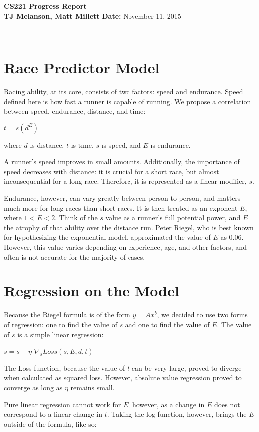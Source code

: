 \documentclass{article}
\newcommand{\hwheadings}[1]{
{\bf \hspace{-2.5mm} CS221 Progress Report} \hfill { }\\
{{\bf TJ Melanson, Matt Millett}} \hfill {{\bf Date:} #1}\\
 \\
\rule[0.1in]{\textwidth}{0.025in}
}
\begin{document}
\noindent \hwheadings{November 11, 2015}



\section{Race Predictor Model}

Racing ability, at its core, consists of two factors: speed and endurance. Speed defined here is how fast a runner is capable of running. We propose a correlation between speed, endurance, distance, and time:

$t = s(d^E)$
	
	where $d$ is distance, $t$ is time, $s$ is speed, and $E$ is endurance. 
	
	A runner’s speed improves in small amounts. Additionally, the importance of speed decreases with distance: it is crucial for a short race, but almost inconsequential for a long race. Therefore, it is represented as a linear modifier, $s$. 

	Endurance, however, can vary greatly between person to person, and matters much more for long races than short races. It is then treated as an exponent $E$, where $1 < E < 2$. Think of the $s$ value as a runner's full potential power, and $E$ the atrophy of that ability over the distance run. Peter Riegel, who is best known for hypothesizing the exponential model. approximated the value of $E$ as $0.06$. However, this value varies depending on experience, age, and other factors, and often is not accurate for the majority of cases.
	

\section{Regression on the Model}

	Because the Riegel formula is of the form $y=Ax^b$, we decided to use two forms of regression: one to find the value of $s$ and one to find the value of $E$. The value of $s$ is a simple linear regression:
	
	$s = s - \eta$ $\nabla_s Loss(s,E,d,t)$
	
The Loss function, because the value of $t$ can be very large, proved to diverge when calculated as squared loss. However, absolute value regression proved to converge as long as $\eta$ remains small. 

Pure linear regression cannot work for $E$, however, as a change in $E$ does not correspond to a linear change in $t$. Taking the log function, however, brings the $E$ outside of the formula, like so:
\end{document}
